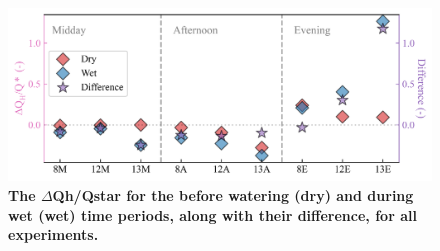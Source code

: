 \documentclass[final,3p,times,authoryear]{elsarticle}
\newcommand{\beginsupplement}{%
        \setcounter{table}{0}
        \renewcommand{\thetable}{S\arabic{table}}%
        \setcounter{figure}{0}
        \renewcommand{\thefigure}{S\arabic{figure}}%
     }
\begin{document}

\begin{figure}
\centering
\includegraphics[trim={0 0 0 0},clip,scale=1.0]{pict047.png}
\caption{\bf The $\Delta$\gls{Qh}/\gls{Qstar} for the before watering (dry) and during wet (wet) time periods, along with their difference, for all experiments.}
 \label{fig:7.19}
\end{figure}


\end{document}

